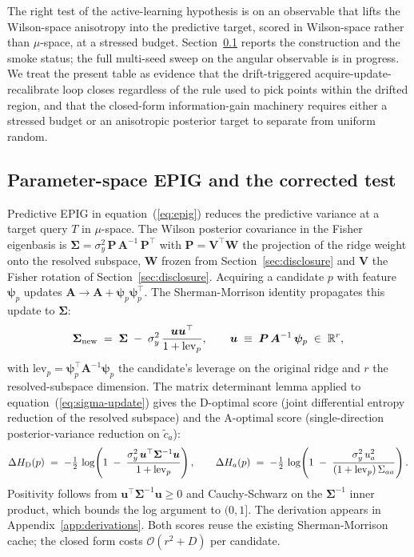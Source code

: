 \documentclass[11pt,a4paper]{article}
\newcommand{\psib}{\bm{\psi}}
\begin{document}
The right test of the active-learning hypothesis is on an observable that lifts the Wilson-space anisotropy into the predictive target, scored in Wilson-space rather than $\mu$-space, at a stressed budget. Section~\ref{sec:param-epig} reports the construction and the smoke status; the full multi-seed sweep on the angular observable is in progress. We treat the present table as evidence that the drift-triggered acquire-update-recalibrate loop closes regardless of the rule used to pick points within the drifted region, and that the closed-form information-gain machinery requires either a stressed budget or an anisotropic posterior target to separate from uniform random.

\subsection{Parameter-space EPIG and the corrected test}
\label{sec:param-epig}

Predictive EPIG in equation~(\ref{eq:epig}) reduces the predictive variance at a target query $T$ in $\mu$-space. The Wilson posterior covariance in the Fisher eigenbasis is $\bm{\Sigma} = \sigma_y^2\,\bm{P}\,\bm{A}^{-1}\,\bm{P}^\top$ with $\bm{P} = \bm{V}^\top \bm{W}$ the projection of the ridge weight onto the resolved subspace, $\bm{W}$ frozen from Section~\ref{sec:disclosure} and $\bm{V}$ the Fisher rotation of Section~\ref{sec:disclosure}. Acquiring a candidate $p$ with feature $\psib_p$ updates $\bm{A} \to \bm{A} + \psib_p\psib_p^\top$. The Sherman-Morrison identity propagates this update to $\bm{\Sigma}$:
\begin{equation}
  \bm{\Sigma}_{\rm new} \;=\; \bm{\Sigma} \;-\; \sigma_y^2\,\frac{\bm{u}\bm{u}^\top}{1 + \mathrm{lev}_p}, \qquad \bm{u} \;\equiv\; \bm{P}\,\bm{A}^{-1}\,\psib_p \;\in\; \mathbb{R}^r,
  \label{eq:sigma-update}
\end{equation}
with $\mathrm{lev}_p = \psib_p^\top \bm{A}^{-1} \psib_p$ the candidate's leverage on the original ridge and $r$ the resolved-subspace dimension. The matrix determinant lemma applied to equation~(\ref{eq:sigma-update}) gives the D-optimal score (joint differential entropy reduction of the resolved subspace) and the A-optimal score (single-direction posterior-variance reduction on $\tilde{c}_a$):
\begin{equation}
  \Delta H_{\rm D}(p) \;=\; -\tfrac{1}{2}\,\log\!\left(1 \;-\; \frac{\sigma_y^2\,\bm{u}^\top \bm{\Sigma}^{-1}\bm{u}}{1 + \mathrm{lev}_p}\right), \qquad
  \Delta H_a(p) \;=\; -\tfrac{1}{2}\,\log\!\left(1 \;-\; \frac{\sigma_y^2\,u_a^2}{(1 + \mathrm{lev}_p)\,\Sigma_{aa}}\right).
  \label{eq:param-epig}
\end{equation}
Positivity follows from $\bm{u}^\top \bm{\Sigma}^{-1} \bm{u} \geq 0$ and Cauchy-Schwarz on the $\bm{\Sigma}^{-1}$ inner product, which bounds the log argument to $(0, 1]$. The derivation appears in Appendix~\ref{app:derivations}. Both scores reuse the existing Sherman-Morrison cache; the closed form costs $\mathcal{O}(r^2 + D)$ per candidate.
\end{document}
